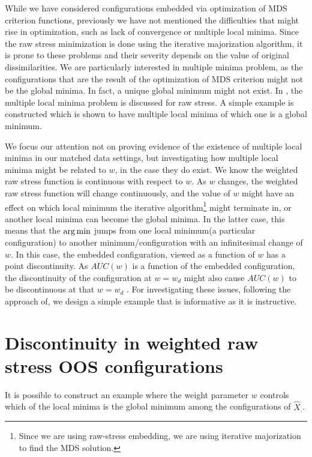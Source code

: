 \documentclass[12pt,oneside,final]{thesis}\usepackage[]{graphicx}\usepackage[]{color}
\begin{document}
While we have considered  configurations embedded via optimization of  MDS criterion functions, previously  we have not mentioned  the difficulties that might rise in optimization, such as lack of convergence or multiple local minima. Since the raw stress minimization is done using the iterative majorization algorithm, it is prone to these problems and their severity depends on the value of  original dissimilarities. We are particularly interested in multiple minima problem, as the configurations that are the result of the optimization of MDS criterion might not be the global minima. In fact, a unique global minimum might not exist. In \cite{TrossetLocalMin}, the multiple local minima problem is discussed for raw stress. A simple example is constructed which is shown to have multiple local minima of which one is a global minimum.


We focus our attention not  on proving  evidence of the existence of multiple local minima  in our matched data settings, but investigating how multiple local minima might be related to $w$, in the case they do exist. We know the weighted raw stress function is continuous with respect to $w$. As $w$ changes, the weighted raw stress function will change continuously, and the value of $w$ might have an  effect on  which local minimum  the iterative algorithm\footnote{Since we are using raw-stress embedding, we are using iterative majorization to find the MDS solution.} might terminate in, or another local minima can become the global minima. In the latter case, this means that the $\arg\min$ jumps from one local minimum(a particular configuration) to another minimum/configuration with an infinitesimal change of $w$. In this case, the embedded configuration, viewed as a function of $w$ has a point discontinuity. As $AUC(w)$ is a function of the embedded configuration, the discontinuity of the configuration at $w= w_{d}$ might also cause $AUC(w)$ to be discontinuous at that $w=w_{d}$ .   For investigating these issues, following the approach of\cite{TrossetLocalMin}, we design a simple example that is informative as it is instructive.  

\section{ Discontinuity in weighted raw stress OOS configurations\label{subsubsec:Discontinuity}}
 It is  possible to construct an example  where the weight parameter $w$ controls which of the local minima is the global minimum among the configurations of $\hat{X}_{.}$.
\end{document}
